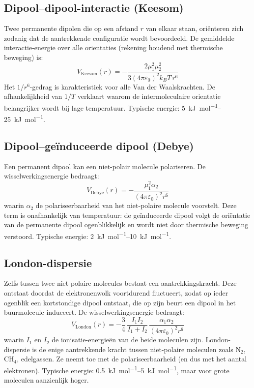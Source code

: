 \subsection{Dipool--dipool-interactie (Keesom)}
\label{sec:keesom}

Twee permanente dipolen die op een afstand $r$ van elkaar staan, ori\"enteren zich zodanig dat de aantrekkende configuratie wordt bevoordeeld. De gemiddelde interactie-energie over alle orientaties (rekening houdend met thermische beweging) is:
\begin{equation}
\boxed{\;V_{\text{Keesom}}(r) = -\frac{2\mu_1^2 \mu_2^2}{3(4\pi\varepsilon_0)^2 k_B T\, r^6}\;}
\end{equation}
Het $1/r^6$-gedrag is karakteristiek voor alle Van der Waalskrachten. De afhankelijkheid van $1/T$ verklaart waarom de intermoleculaire orientatie belangrijker wordt bij lage temperatuur. Typische energie: \SIrange{5}{25}{\kilo\joule\per\mole}.

\subsection{Dipool--ge\"induceerde dipool (Debye)}

Een permanent dipool kan een niet-polair molecule polariseren. De wisselwerkingsenergie bedraagt:
\begin{equation}
\boxed{\;V_{\text{Debye}}(r) = -\frac{\mu_1^2 \alpha_2}{(4\pi\varepsilon_0)^2 r^6}\;}
\end{equation}
waarin $\alpha_2$ de polariseerbaarheid van het niet-polaire molecule voorstelt. Deze term is onafhankelijk van temperatuur: de geïnduceerde dipool volgt de oriëntatie van de permanente dipool ogenblikkelijk en wordt niet door thermische beweging verstoord. Typische energie: \SIrange{2}{10}{\kilo\joule\per\mole}.

\subsection{London-dispersie}
\label{sec:london}

Zelfs tussen twee niet-polaire molecules bestaat een aantrekkingskracht. Deze ontstaat doordat de elektronenwolk voortdurend fluctueert, zodat op ieder ogenblik een kortstondige dipool ontstaat, die op zijn beurt een dipool in het buurmolecule induceert. De wisselwerkingsenergie bedraagt:
\begin{equation}
\boxed{\;V_{\text{London}}(r) = -\frac{3}{4}\,\frac{I_1 I_2}{I_1 + I_2}\,\frac{\alpha_1 \alpha_2}{(4\pi\varepsilon_0)^2 r^6}\;}
\end{equation}
waarin $I_1$ en $I_2$ de ionisatie-energie\"en van de beide moleculen zijn. London-dispersie is de enige aantrekkende kracht tussen niet-polaire moleculen zoals $\mathrm{N_2}$, $\mathrm{CH_4}$, edelgassen. Ze neemt toe met de polariseerbaarheid (en dus met het aantal elektronen). Typische energie: \SIrange{0.5}{5}{\kilo\joule\per\mole}, maar voor grote moleculen aanzienlijk hoger.

